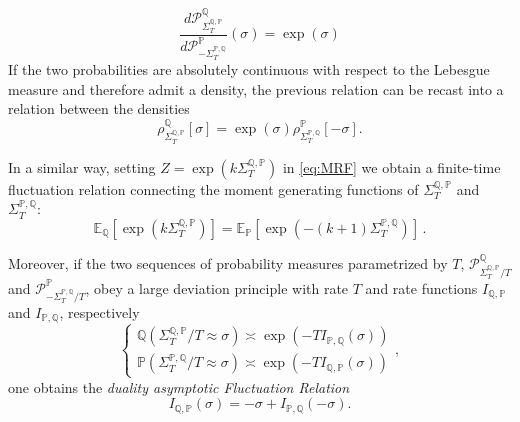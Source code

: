 \documentclass[a4paper,11pt]{article}
\numberwithin{equation}{section}
\begin{document}
\begin{equation}
    \frac{d\mathcal{P}_{\varSigma_{T}^{\mathbb{Q},\mathbb{P}}}^\mathbb{Q}}{d\mathcal{P}_{-\varSigma_{T}^{\mathbb{P},\mathbb{Q}}}^\mathbb{P}} (\sigma) = \exp(\sigma)
\end{equation}
If the two probabilities are absolutely continuous with respect to the Lebesgue measure and therefore admit a density, the previous relation can be recast into a relation between the densities
\begin{equation}
\rho_{\varSigma_{T}^{\mathbb{Q},\mathbb{P}}}^{\mathbb{Q}}\left[\sigma\right]=\exp\left(\sigma\right)\rho_{\varSigma_{T}^{\mathbb{P},\mathbb{Q}}}^{\mathbb{P}}\left[-\sigma\right].
\label{eq:DFR}
\end{equation}

 In a similar way, setting $Z=\exp\left(k\varSigma_{T}^{\mathbb{Q},\mathbb{P}}  \right)$
in \eqref{eq:MRF} we obtain a finite-time fluctuation relation connecting the moment generating functions of $\varSigma_{T}^{\mathbb{Q},\mathbb{P}}$ and $\varSigma_{T}^{\mathbb{P},\mathbb{Q}}$:
\begin{equation}\label{eq:MRF-2}
\mathbb{E}_{\mathbb{Q}}\left[\exp\left(k\varSigma_{T}^{\mathbb{Q},\mathbb{P}}\right)\right]=\mathbb{E}_{\mathbb{P}}\left[\exp\left(-\left(k+1\right)\varSigma_{T}^{\mathbb{P},\mathbb{Q}}\right)\right] \,.
\end{equation}



Moreover, if the two sequences of probability measures parametrized by $T$, $ \mathcal{P}_{\varSigma_{T}^{\mathbb{Q},\mathbb{P}}/T}^\mathbb{Q}$  and $\mathcal{P}_{-\varSigma_{T}^{\mathbb{P},\mathbb{Q}}/T}^\mathbb{P} $, obey a large deviation principle with rate $T$ and rate functions $I_{\mathbb{Q},\mathbb{P}}$ and $I_{\mathbb{P},\mathbb{Q}}$, respectively
\begin{equation}\label{eq:ldestimates}
  \begin{cases}
\mathbb{Q} \left(\varSigma_{T}^{\mathbb{Q},\mathbb{P}} /T\approx \sigma \right) \asymp\exp\left(-TI_{\mathbb{P},\mathbb{Q}}(\sigma)\right)\\
\mathbb{P} \left(\varSigma_{T}^{\mathbb{P},\mathbb{Q}} /T\approx \sigma \right)  \asymp\exp\left(-TI_{\mathbb{Q},\mathbb{P}} (\sigma)\right)
\end{cases}  ,
\end{equation}
one obtains the \emph{duality asymptotic Fluctuation
Relation}
\begin{equation}
I_{\mathbb{Q},\mathbb{P}}\left(\sigma\right)=-\sigma+I_{\mathbb{P},\mathbb{Q}}\left(-\sigma\right).\label{eq:GC1}
\end{equation}
\end{document}
